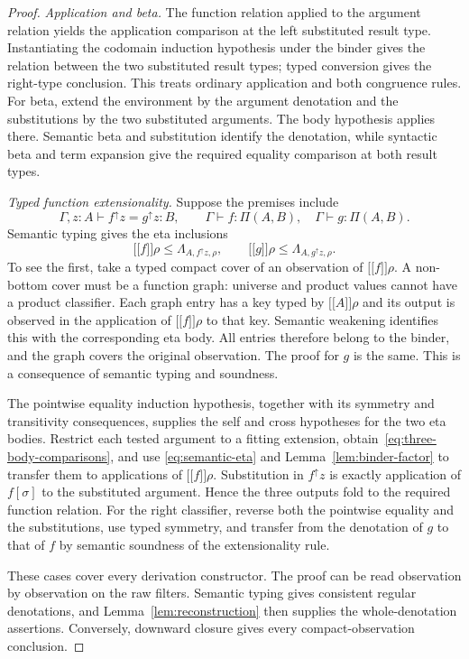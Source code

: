 \documentclass[11pt,a4paper]{article}
\theoremstyle{definition}
\theoremstyle{remark}
\newcommand{\ev}[1]{\mathopen{[\![}#1\mathclose{]\!]}}
\begin{document}
\begin{proof}
\smallskip\noindent\emph{Application and beta.}
The function relation applied to the argument relation yields the
application comparison at the left substituted result type.
Instantiating the codomain induction hypothesis under the binder gives
the relation between the two substituted result types; typed conversion
gives the right-type conclusion. This treats ordinary application and
both congruence rules. For beta, extend the environment by the argument
denotation and the substitutions by the two substituted arguments.
The body hypothesis applies there. Semantic beta and substitution
identify the denotation, while syntactic beta and term expansion give
the required equality comparison at both result types.

\smallskip\noindent\emph{Typed function extensionality.}
Suppose the premises include
\[
 \Gamma,z:A\vdash f^{\uparrow}z=g^{\uparrow}z:B,
 \qquad \Gamma\vdash f:\Pi(A,B),\quad
 \Gamma\vdash g:\Pi(A,B).
\]
Semantic typing gives the eta inclusions
\begin{equation}\label{eq:semantic-eta}
 \ev f\rho\leq\Lambda_{A,f^{\uparrow}z,\rho},\qquad
 \ev g\rho\leq\Lambda_{A,g^{\uparrow}z,\rho}.
\end{equation}
To see the first, take a typed compact cover of an observation of
$\ev f\rho$. A non-bottom cover must be a function graph: universe and
product values cannot have a product classifier. Each graph entry has a
key typed by $\ev A\rho$ and its output is observed in the application
of $\ev f\rho$ to that key. Semantic weakening identifies this with the
corresponding eta body. All entries therefore belong to the binder,
and the graph covers the original observation. The proof for $g$ is
the same. This is a consequence of semantic typing and soundness.

The pointwise equality induction hypothesis, together with its symmetry
and transitivity consequences, supplies the self and cross hypotheses
for the two eta bodies. Restrict each tested argument to a fitting
extension, obtain~\eqref{eq:three-body-comparisons}, and use
\eqref{eq:semantic-eta} and Lemma~\ref{lem:binder-factor} to transfer them
to applications of $\ev f\rho$. Substitution in $f^{\uparrow}z$ is exactly
application of $f[\sigma]$ to the substituted argument. Hence the three
outputs fold to the required function relation. For the right classifier,
reverse both the pointwise equality and the substitutions, use typed
symmetry, and transfer from the denotation of $g$ to that of $f$ by
semantic soundness of the extensionality rule.

These cases cover every derivation constructor. The proof can be read
observation by observation on the raw filters. Semantic typing gives
consistent regular denotations, and Lemma~\ref{lem:reconstruction}
then supplies the whole-denotation assertions. Conversely, downward
closure gives every compact-observation conclusion.
\end{proof}
\end{document}
